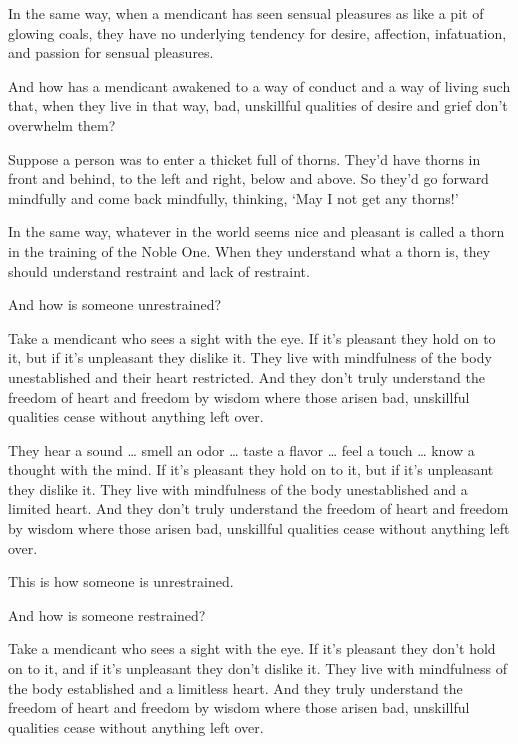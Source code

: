 \documentclass[12pt,openany]{book}%
\begin{document}
In the same way, when a mendicant has seen sensual pleasures as like a pit of glowing coals, they have no underlying tendency for desire, affection, infatuation, and passion for sensual pleasures. 

And how has a mendicant awakened to a way of conduct and a way of living such that, when they live in that way, bad, unskillful qualities of desire and grief don’t overwhelm them? 

Suppose a person was to enter a thicket full of thorns. They’d have thorns in front and behind, to the left and right, below and above. So they’d go forward mindfully and come back mindfully, thinking, ‘May I not get any thorns!’ 

In the same way, whatever in the world seems nice and pleasant is called a thorn in the training of the Noble One. When they understand what a thorn is, they should understand restraint and lack of restraint. 

And how is someone unrestrained? 

Take a mendicant who sees a sight with the eye. If it’s pleasant they hold on to it, but if it’s unpleasant they dislike it. They live with mindfulness of the body unestablished and their heart restricted. And they don’t truly understand the freedom of heart and freedom by wisdom where those arisen bad, unskillful qualities cease without anything left over. 

They hear a sound … smell an odor … taste a flavor … feel a touch … know a thought with the mind. If it’s pleasant they hold on to it, but if it’s unpleasant they dislike it. They live with mindfulness of the body unestablished and a limited heart. And they don’t truly understand the freedom of heart and freedom by wisdom where those arisen bad, unskillful qualities cease without anything left over. 

This is how someone is unrestrained. 

And how is someone restrained? 

Take a mendicant who sees a sight with the eye. If it’s pleasant they don’t hold on to it, and if it’s unpleasant they don’t dislike it. They live with mindfulness of the body established and a limitless heart. And they truly understand the freedom of heart and freedom by wisdom where those arisen bad, unskillful qualities cease without anything left over. 
\end{document}
